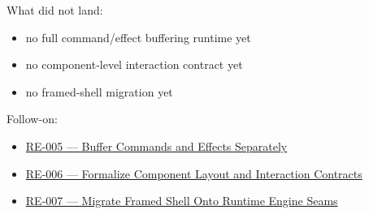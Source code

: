 What did not land:

\begin{itemize}
\tightlist
\item
  no full command/effect buffering runtime yet
\item
  no component-level interaction contract yet
\item
  no framed-shell migration yet
\end{itemize}

Follow-on:

\begin{itemize}
\tightlist
\item
  \href{https://github.com/flyingrobots/bijou/blob/cbd70612140e7a450d764b3c7be1c6af878b99bc/docs/design/RE-005-buffer-commands-and-effects-separately.md}{RE-005 --- Buffer Commands and Effects Separately}
\item
  \href{https://github.com/flyingrobots/bijou/blob/cbd70612140e7a450d764b3c7be1c6af878b99bc/docs/design/RE-006-formalize-component-layout-and-interaction-contracts.md}{RE-006 --- Formalize Component Layout and Interaction Contracts}
\item
  \href{https://github.com/flyingrobots/bijou/blob/cbd70612140e7a450d764b3c7be1c6af878b99bc/docs/method/graveyard/legacy-backlog/up-next/RE-007-migrate-framed-shell-onto-runtime-engine-seams.md}{RE-007 --- Migrate Framed Shell Onto Runtime Engine Seams}
\end{itemize}

